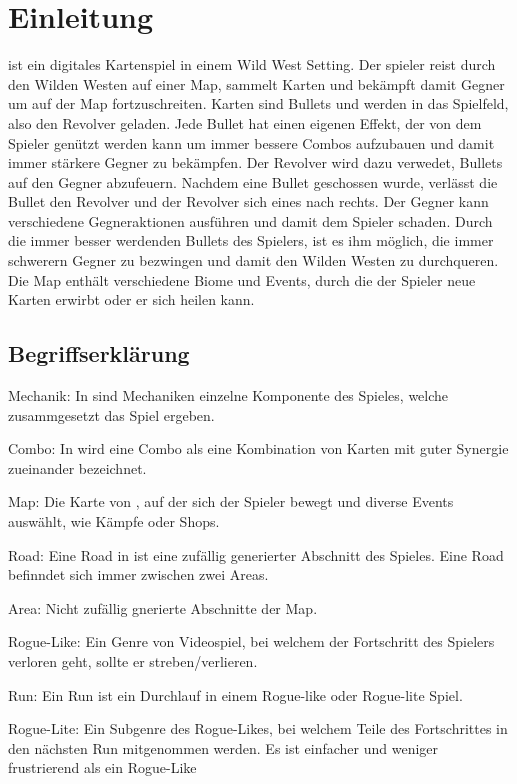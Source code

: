 
\section{Einleitung}\label{sec:einleitung}

\renewcommand{\kapitelautor}{Autor: Philip Jankovic}


\FF ist ein digitales Kartenspiel in einem Wild West Setting. Der spieler reist durch den Wilden Westen auf einer Map,
sammelt Karten und bekämpft damit Gegner um auf der Map fortzuschreiten. Karten sind Bullets und werden in das Spielfeld, also den Revolver geladen.
Jede Bullet hat einen eigenen Effekt, der von dem Spieler genützt werden kann um immer bessere Combos aufzubauen und damit immer stärkere Gegner zu bekämpfen.
Der Revolver wird dazu verwedet, Bullets auf den Gegner abzufeuern. Nachdem eine Bullet geschossen wurde, verlässt die
Bullet den Revolver und der Revolver sich eines nach rechts. Der Gegner kann verschiedene Gegneraktionen ausführen und damit dem Spieler schaden.
Durch die  immer besser werdenden Bullets des Spielers, ist es ihm möglich, die immer schwerern Gegner zu bezwingen und damit den Wilden Westen zu durchqueren.
Die Map enthält verschiedene Biome und Events, durch die der Spieler neue Karten erwirbt oder er sich heilen kann.



\subsection{Begriffserklärung}\label{begriffserklärung}
Mechanik: In \FF sind Mechaniken einzelne Komponente des Spieles, welche zusammgesetzt das Spiel ergeben.

Combo: In \FF wird eine Combo als eine Kombination von Karten mit guter Synergie zueinander bezeichnet.


Map: Die Karte von \FF, auf der sich der Spieler bewegt und diverse Events auswählt, wie \zB Kämpfe oder Shops.

Road: Eine Road in \FF ist eine zufällig generierter Abschnitt des Spieles. Eine Road befinndet sich immer zwischen zwei Areas.

Area: Nicht zufällig gnerierte Abschnitte der \FF Map.

Rogue-Like: Ein Genre von Videospiel, bei welchem der Fortschritt des Spielers verloren geht, sollte er streben/verlieren. 

Run: Ein Run ist ein Durchlauf in einem Rogue-like oder Rogue-lite Spiel. 

Rogue-Lite: Ein Subgenre des Rogue-Likes, bei welchem Teile des Fortschrittes in den nächsten Run mitgenommen werden.
Es ist einfacher und weniger frustrierend als ein Rogue-Like 

%

\renewcommand{\kapitelautor}{}
